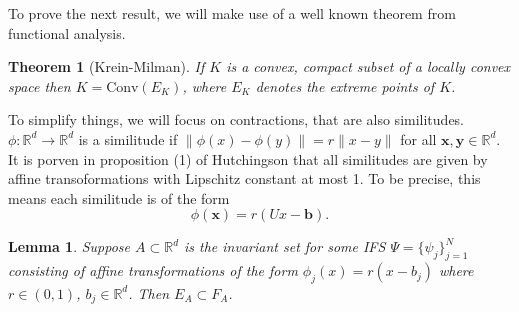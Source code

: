 \documentclass [52pt] {article}
\newcommand{\R}{\mathbb{R}}
\newcommand{\conv}{\text{Conv}}
\newtheorem{theorem}{Theorem}
\newtheorem{lemma}{Lemma}
\begin{document}
To prove the next result, we will make use of a well known theorem from functional analysis.

\begin{theorem}[Krein-Milman]
If $K$ is a convex, compact subset of a locally convex space then $K = \conv(E_K)$, where $E_K$ denotes the extreme points of $K$.
\end{theorem}

To simplify things, we will focus on contractions, that are also similitudes. $\phi:\R^d\to\R^d$ is a similitude if $\|\phi(x) -\phi(y)\| = r\|x-y\|$ for all $\mathbf{x}, \mathbf{y}\in\R^d$.  It is porven in proposition (1) of Hutchingson that all similitudes are given by affine transoformations with Lipschitz constant at most 1.  To be precise, this means each similitude is of the form
\[\phi(\mathbf{x}) = r(Ux - \mathbf{b}).\]


\begin{lemma}
Suppose $A\subset \R^d$ is the invariant set for some IFS $\Psi = \{\psi_j\}_{j=1}^N$ consisting of affine transformations of the form $\phi_j(x) = r(x-b_j)$ where $r\in(0,1)$, $b_j\in\R^d$.  Then $E_A \subset F_A$.  
\end{lemma}
\end{document}
